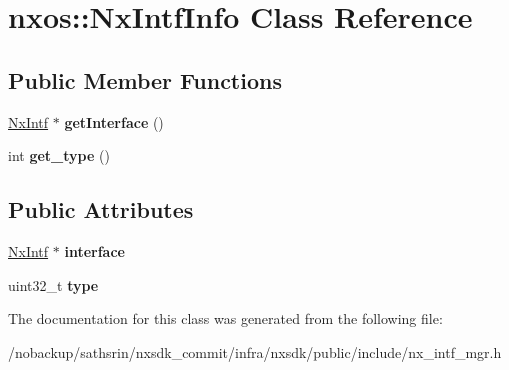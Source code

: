 \hypertarget{classnxos_1_1NxIntfInfo}{\section{nxos\-:\-:Nx\-Intf\-Info Class Reference}
\label{classnxos_1_1NxIntfInfo}
}
\subsection*{Public Member Functions}
\begin{DoxyCompactItemize}
\item 
\hypertarget{classnxos_1_1NxIntfInfo_a95a341994cb39c50fb1871cd8db6bf1d}{\hyperlink{classnxos_1_1NxIntf}{Nx\-Intf} $\ast$ {\bfseries get\-Interface} ()}\label{classnxos_1_1NxIntfInfo_a95a341994cb39c50fb1871cd8db6bf1d}

\item 
\hypertarget{classnxos_1_1NxIntfInfo_a392cdbbbaac678396336756fcbbd6b04}{int {\bfseries get\-\_\-type} ()}\label{classnxos_1_1NxIntfInfo_a392cdbbbaac678396336756fcbbd6b04}

\end{DoxyCompactItemize}
\subsection*{Public Attributes}
\begin{DoxyCompactItemize}
\item 
\hypertarget{classnxos_1_1NxIntfInfo_a086ba305d509be3dff761cdef6fbf7df}{\hyperlink{classnxos_1_1NxIntf}{Nx\-Intf} $\ast$ {\bfseries interface}}\label{classnxos_1_1NxIntfInfo_a086ba305d509be3dff761cdef6fbf7df}

\item 
\hypertarget{classnxos_1_1NxIntfInfo_a9c81840a5279a5246b69b7e6579e813f}{uint32\-\_\-t {\bfseries type}}\label{classnxos_1_1NxIntfInfo_a9c81840a5279a5246b69b7e6579e813f}

\end{DoxyCompactItemize}


The documentation for this class was generated from the following file\-:\begin{DoxyCompactItemize}
\item 
/nobackup/sathsrin/nxsdk\-\_\-commit/infra/nxsdk/public/include/nx\-\_\-intf\-\_\-mgr.\-h\end{DoxyCompactItemize}
